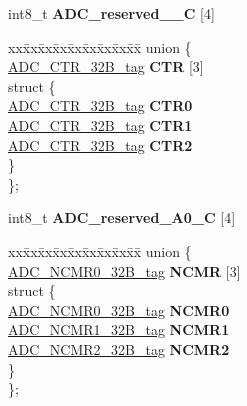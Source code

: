 \begin{DoxyCompactItemize}
\begin{tabbing}
\end{tabbing}\item 
\mbox{\label{structADC__struct__tag_a53c39a9e0ddfd68e1c5dc30f3f1276bc}} 
int8\+\_\+t {\bfseries A\+D\+C\+\_\+reserved\+\_\+\_\+C} \mbox{[}4\mbox{]}
\item 
\mbox{\label{structADC__struct__tag_a3950829efab60fc1493b63e17af8cfce}} 
\begin{tabbing}
xx\=xx\=xx\=xx\=xx\=xx\=xx\=xx\=xx\=\kill
union \{\\
\>\mbox{\hyperlink{unionADC__CTR__32B__tag}{ADC\_CTR\_32B\_tag}} {\bfseries CTR} \mbox{[}3\mbox{]}\\
\mbox{\label{unionADC__struct__tag_1_1_0D1824_a8c88c822e281c10c7929397e42f9d1e0}} 
\>struct \{\\
\>\>\mbox{\hyperlink{unionADC__CTR__32B__tag}{ADC\_CTR\_32B\_tag}} {\bfseries CTR0}\\
\>\>\mbox{\hyperlink{unionADC__CTR__32B__tag}{ADC\_CTR\_32B\_tag}} {\bfseries CTR1}\\
\>\>\mbox{\hyperlink{unionADC__CTR__32B__tag}{ADC\_CTR\_32B\_tag}} {\bfseries CTR2}\\
\>\} \\
\}; \\

\end{tabbing}\item 
\mbox{\label{structADC__struct__tag_a40fedcbdc8f3741c7e57f9c5a9750203}} 
int8\+\_\+t {\bfseries A\+D\+C\+\_\+reserved\+\_\+A0\+\_\+C} \mbox{[}4\mbox{]}
\item 
\mbox{\label{structADC__struct__tag_a4289d8ccd194710aaa5117fac480dbb6}} 
\begin{tabbing}
xx\=xx\=xx\=xx\=xx\=xx\=xx\=xx\=xx\=\kill
union \{\\
\>\mbox{\hyperlink{unionADC__NCMR0__32B__tag}{ADC\_NCMR0\_32B\_tag}} {\bfseries NCMR} \mbox{[}3\mbox{]}\\
\mbox{\label{unionADC__struct__tag_1_1_0D1826_aebd26a3f896bab07b363521c4a5e086c}} 
\>struct \{\\
\>\>\mbox{\hyperlink{unionADC__NCMR0__32B__tag}{ADC\_NCMR0\_32B\_tag}} {\bfseries NCMR0}\\
\>\>\mbox{\hyperlink{unionADC__NCMR1__32B__tag}{ADC\_NCMR1\_32B\_tag}} {\bfseries NCMR1}\\
\>\>\mbox{\hyperlink{unionADC__NCMR2__32B__tag}{ADC\_NCMR2\_32B\_tag}} {\bfseries NCMR2}\\
\>\} \\
\}; \\


\end{tabbing}
\end{DoxyCompactItemize}
